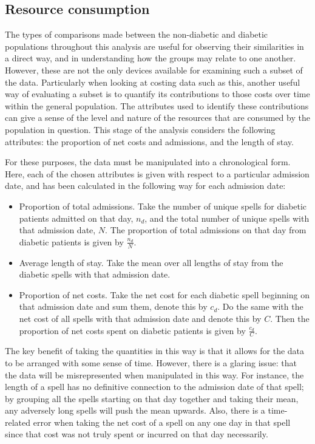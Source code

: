 \subsection{Resource consumption}\label{subsec:diab_resources}

The types of comparisons made between the non-diabetic and diabetic populations
throughout this analysis are useful for observing their similarities in a direct
way, and in understanding how the groups may relate to one another. However,
these are not the only devices available for examining such a subset of the
data. Particularly when looking at costing data such as this, another useful way
of evaluating a subset is to quantify its contributions to those costs over time
within the general population. The attributes used to identify these
contributions can give a sense of the level and nature of the resources that are
consumed by the population in question. This stage of the analysis considers the
following attributes: the proportion of net costs and admissions, and the length
of stay. 

For these purposes, the data must be manipulated into a chronological form.
Here, each of the chosen attributes is given with respect to a particular
admission date, and has been calculated in the following way for each admission
date:
\begin{itemize}
    \item Proportion of total admissions. Take the number of unique
        spells for diabetic patients admitted on that day, \(n_d\), and the
        total number of unique spells with that admission date, \(N\). The
        proportion of total admissions on that day from diabetic patients is
        given by \(\frac{n_d}{N}\).
    \item Average length of stay. Take the mean over all lengths of
        stay from the diabetic spells with that admission date.
    \item Proportion of net costs. Take the net cost for each diabetic
        spell beginning on that admission date and sum them, denote this by
        \(c_d\). Do the same with the net cost of all spells with that admission
        date and denote this by \(C\). Then the proportion of net costs spent on
        diabetic patients is given by \(\frac{c_d}{C}\).
\end{itemize}

The key benefit of taking the quantities in this way is that it allows for the
data to be arranged with some sense of time. However, there is a glaring issue:
that the data will be misrepresented when manipulated in this way. For instance,
the length of a spell has no definitive connection to the admission date of that
spell; by grouping all the spells starting on that day together and taking their
mean, any adversely long spells will push the mean upwards. Also, there is a
time-related error when taking the net cost of a spell on any one day in that
spell since that cost was not truly spent or incurred on that day necessarily.

